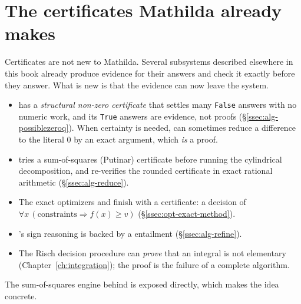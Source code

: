 \section{The certificates Mathilda already makes}
\label{sec:cert-internal}

Certificates are not new to Mathilda. Several subsystems described elsewhere in this
book already produce evidence for their answers and check it exactly before they
answer. What is new is that the evidence can now leave the system.

\begin{itemize}
\item {} has a \emph{structural non-zero certificate} that settles
  many \texttt{False} answers with no numeric work, and its \texttt{True} answers are
  evidence, not proofs (\S\ref{ssec:alg-possiblezeroq}). When certainty is needed,
   can sometimes reduce a difference to the literal \(0\) by an exact
  argument, which \emph{is} a proof.
\item {} tries a sum-of-squares (Putinar) certificate before running the
  cylindrical decomposition, and re-verifies the rounded certificate in exact rational
  arithmetic (\S\ref{ssec:alg-reduce}).
\item The exact optimizers  and  finish with a certificate:
  a  decision of \(\forall x\,(\text{constraints}\Rightarrow f(x)\ge v)\)
  (\S\ref{ssec:opt-exact-method}).
\item {}'s sign reasoning is backed by a  entailment
  (\S\ref{ssec:alg-refine}).
\item The Risch decision procedure can \emph{prove} that an integral is not
  elementary (Chapter~\ref{ch:integration}); the proof is the failure of a complete
  algorithm.
\end{itemize}

The sum-of-squares engine behind  is exposed directly, which makes the idea
concrete.

\begin{codepairs}
\end{codepairs}


